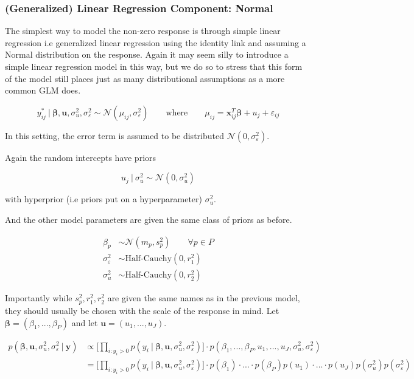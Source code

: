 \documentclass[12pt,twoside]{reedthesis}
\begin{document}
\hypertarget{generalized-linear-regression-component-normal}{%
\subsubsection{(Generalized) Linear Regression Component: Normal}\label{generalized-linear-regression-component-normal}}

The simplest way to model the non-zero response is through simple linear regression i.e generalized linear regression using the identity link and assuming a Normal distribution on the response. Again it may seem silly to introduce a simple linear regression model in this way, but we do so to stress that this form of the model still places just as many distributional assumptions as a more common GLM does.

\[
y^*_{ij} \ | \ \boldsymbol{\beta}, \boldsymbol{u}, \sigma_u^2,  \sigma_{\varepsilon}^2 \sim \mathcal{N}(\mu_{ij}, \sigma_{\varepsilon}^2) \qquad \text{where} \qquad \mu_{ij} = \mathbf{x}_{ij}^T\boldsymbol{\beta} + u_j + \varepsilon_{ij}
\]

In this setting, the error term is assumed to be distributed \(\mathcal{N}(0, \sigma_{\varepsilon}^2)\).

Again the random intercepts have priors

\[
u_j \ | \ \sigma_u^2 \sim \mathcal{N}(0, \sigma_u^2)
\]

with hyperprior (i.e priors put on a hyperparameter) \(\sigma_u^2\).

And the other model parameters are given the same class of priors as before.

\[
\begin{aligned}
\beta_p &\sim \mathcal{N}(m_p, s_p^2)  \qquad \forall p\in P \\
\sigma_{\varepsilon}^2 &\sim \text{Half-Cauchy}(0, r_1^2) \\
\sigma_u^2 &\sim \text{Half-Cauchy}(0, r_2^2)
\end{aligned}
\]

Importantly while \(s_p^2, r_1^2, r_2^2\) are given the same names as in the previous model, they should usually be chosen with the scale of the response in mind. Let \(\boldsymbol{\beta} = (\beta_1, ..., \beta_P)\) and let \(\mathbf{u} = (u_1, ..., u_J)\).

\[
\begin{aligned}
p(\boldsymbol{\beta}, \boldsymbol{u}, \sigma_u^2, \sigma_{\varepsilon}^2 \ | \ \mathbf{y}) &\propto \bigg[\prod_{i:y_{i} > 0}p(y_{i} \ | \ \boldsymbol{\beta}, \mathbf{u}, \sigma_u^2, \sigma_{\varepsilon}^2)\bigg]\cdot p(\beta_1, ..., \beta_P, u_1, ..., u_J, \sigma_u^2, \sigma_{\varepsilon}^2) \\
 &=\bigg[\prod_{i:y_{i} > 0}p(y_{i} \ | \ \boldsymbol{\beta}, \mathbf{u},\sigma_u^2, \sigma_{\varepsilon}^2)\bigg]\cdot p(\beta_1)\cdot...\cdot p(\beta_P)p(u_1)\cdot ... \cdot p(u_J)p(\sigma_u^2)p( \sigma_{\varepsilon}^2) 
\end{aligned}
\]
\end{document}
